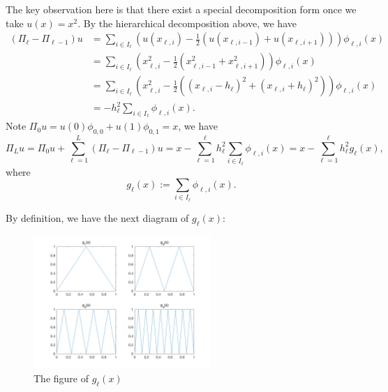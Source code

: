 The key observation here is that there exist a special decomposition form once we take $u(x) = x^2$. 
By the hierarchical decomposition above, we have
\begin{equation}
\begin{aligned}
(\Pi_{\ell} - \Pi_{\ell-1})u &= \sum_{i\in I_\ell}\left( u(x_{\ell,i}) - \frac{1}{2}\left( u(x_{\ell,i-1})  + u(x_{\ell,i+1})  \right) \right)\phi_{\ell,i}(x)\\
&=\sum_{i\in I_\ell}\left(x_{\ell,i}^2 - \frac{1}{2}(x_{\ell,i-1}^2 + x_{\ell,i+1}^2)\right)\phi_{\ell,i}(x)\\
&= \sum_{i\in I_\ell}\left(x_{\ell,i}^2 - \frac{1}{2}\left((x_{\ell,i}-h_\ell)^2 + (x_{\ell,i}+h_\ell)^2\right) \right)\phi_{\ell,i}(x) \\
&=-h_\ell^2\sum_{i\in I_\ell}\phi_{\ell,i}(x).
\end{aligned}
\end{equation}
Note $\Pi_0 u = u(0)\phi_{0,0} + u(1)\phi_{0,1} = x$, we have
\begin{equation}
\Pi_L u = \Pi_0 u + \sum_{\ell=1}^L  (\Pi_\ell - \Pi_{\ell-1})u = x -\sum_{\ell=1}^\ell h^2_\ell \sum_{i\in I_\ell}\phi_{\ell,i}(x) = x -\sum_{\ell=1}^\ell h^2_\ell g_\ell(x),
\end{equation}
where
\begin{equation}\label{key}
g_\ell(x) := \sum_{i\in I_\ell}\phi_{\ell,i}(x).
\end{equation}

By definition, we have the next diagram of $g_\ell(x)$:
\begin{figure}[h!]
	\centering
	\includegraphics[width=0.6\textwidth]{figures/hierachybasis_gl}
	\caption{The figure of $g_\ell(x)$}
	\label{fig:gl}
\end{figure}


